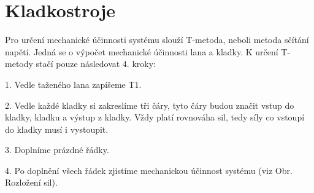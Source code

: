 \section{Kladkostroje}

Pro určení mechanické účinnosti systému slouží T-metoda, neboli metoda sčítání napětí. Jedná se o výpočet mechanické účinnosti lana a kladky. K určení T-metody stačí pouze následovat 4. kroky:

1. Vedle taženého lana zapíšeme T1.

2. Vedle každé kladky si zakreslíme tři čáry, tyto čáry budou značit vstup do kladky, kladku a výstup z kladky. Vždy platí rovnováha sil, tedy síly co vstoupí do kladky musí i vystoupit.

3. Doplníme prázdné řádky.

4. Po doplnění všech řádek zjistíme mechanickou účinnost systému \cite{rope_rescue_web_calculating_MA_T_system} (viz Obr. Rozložení sil).
\newpage

